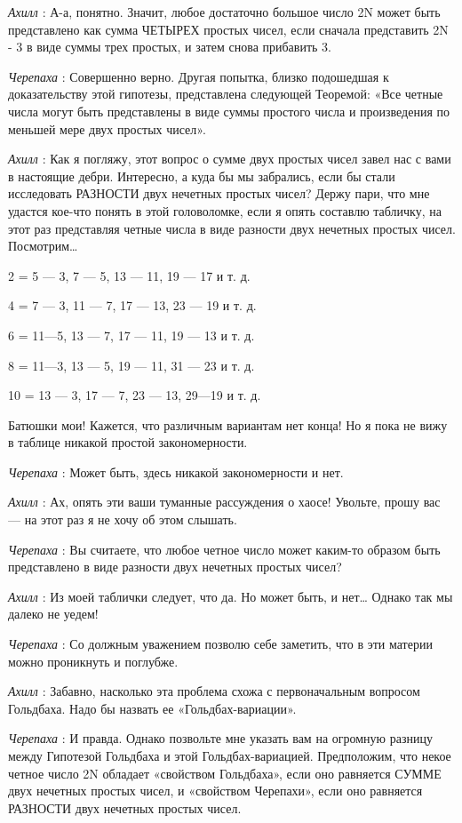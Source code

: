 \documentclass[../main.tex]{subfiles}
\begin{document}
\begin{dialogue}
\emph{Ахилл} : А-а, понятно. Значит, любое достаточно большое число 2N может быть представлено как сумма ЧЕТЫРЕХ простых чисел, если сначала представить 2N - 3 в виде суммы трех простых, и затем снова прибавить 3.

\emph{Черепаха} : Совершенно верно. Другая попытка, близко подошедшая к доказательству этой гипотезы, представлена следующей Теоремой: «Все четные числа могут быть представлены в виде суммы простого числа и произведения по меньшей мере двух простых чисел».

\emph{Ахилл} : Как я погляжу, этот вопрос о сумме двух простых чисел завел нас с вами в настоящие дебри. Интересно, а куда бы мы забрались, если бы стали исследовать РАЗНОСТИ двух нечетных простых чисел? Держу пари, что мне удастся кое-что понять в этой головоломке, если я опять составлю табличку, на этот раз представляя четные числа в виде разности двух нечетных простых чисел. Посмотрим\ldots{}

2 = 5 --- 3, 7 --- 5, 13 --- 11, 19 --- 17 и т. д.

4 = 7 --- 3, 11 --- 7, 17 --- 13, 23 --- 19 и т. д.

6 = 11---5, 13 --- 7, 17 --- 11, 19 --- 13 и т. д.

8 = 11---3, 13 --- 5, 19 --- 11, 31 --- 23 и т. д.

10 = 13 --- 3, 17 --- 7, 23 --- 13, 29---19 и т. д.

Батюшки мои! Кажется, что различным вариантам нет конца! Но я пока не вижу в таблице никакой простой закономерности.

\emph{Черепаха} : Может быть, здесь никакой закономерности и нет.

\emph{Ахилл} : Ах, опять эти ваши туманные рассуждения о хаосе! Увольте, прошу вас --- на этот раз я не хочу об этом слышать.

\emph{Черепаха} : Вы считаете, что любое четное число может каким-то образом быть представлено в виде разности двух нечетных простых чисел?

\emph{Ахилл} : Из моей таблички следует, что да. Но может быть, и нет\ldots{} Однако так мы далеко не уедем!

\emph{Черепаха} : Со должным уважением позволю себе заметить, что в эти материи можно проникнуть и поглубже.

\emph{Ахилл} : Забавно, насколько эта проблема схожа с первоначальным вопросом Гольдбаха. Надо бы назвать ее «Гольдбах-вариации».

\emph{Черепаха} : И правда. Однако позвольте мне указать вам на огромную разницу между Гипотезой Гольдбаха и этой Гольдбах-вариацией. Предположим, что некое четное число 2N обладает «свойством Гольдбаха», если оно равняется СУММЕ двух нечетных простых чисел, и «свойством Черепахи», если оно равняется РАЗНОСТИ двух нечетных простых чисел.


\end{dialogue}
\end{document}
